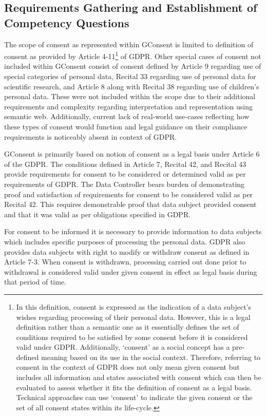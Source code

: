 \subsection{Requirements Gathering and Establishment of Competency Questions}
The scope of consent as represented within GConsent is limited to definition of consent as provided by Article 4-11\footnote{In this definition, consent is expressed as the indication of a data subject's wishes regarding processing of their personal data. However, this is a legal definition rather than a semantic one as it essentially defines the set of conditions required to be satisfied by some consent before it is considered valid under GDPR. Additionally, `consent' as a social concept has a pre-defined meaning based on its use in the social context. Therefore, referring to consent in the context of GDPR does not only mean given consent but includes all information and states associated with consent which can then be evaluated to assess whether it fits the definition of consent as a legal basis. Technical approaches can use `consent' to indicate the given consent or the set of all consent states within its life-cycle.} of GDPR. 
Other special cases of consent not included within GConsent consist of consent defined by Article 9 regarding use of special categories of personal data, Recital 33 regarding use of personal data for scientific research, and Article 8 along with Recital 38 regarding use of children’s personal data.
These were not included within the scope due to their additional requirements and complexity regarding interpretation and representation using semantic web. Additionally, current lack of real-world use-cases reflecting how these types of consent would function and legal guidance on their compliance requirements is noticeably absent in context of GDPR.

GConsent is primarily based on notion of consent as a legal basis under Article 6 of the GDPR. The conditions defined in Article 7, Recital 42, and Recital 43 provide requirements for consent to be considered or determined valid as per requirements of GDPR.
The Data Controller bears burden of demonstrating proof and satisfaction of requirements for consent to be considered valid as per Recital 42. This requires demonstrable proof that data subject provided consent and that it was valid as per obligations specified in GDPR.

For consent to be informed it is necessary to provide information to data subjects which includes specific purposes of processing the personal data.
GDPR also provides data subjects with right to modify or withdraw consent as defined in Article 7-3.
When consent is withdrawn, processing carried out done prior to withdrawal is considered valid under given consent in effect as legal basis during that period of time.

